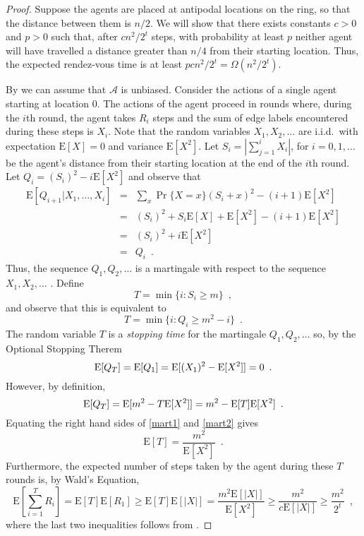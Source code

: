 \documentclass[lotsofwhite]{patmorin}
\newcommand{\E}{\mathrm{E}}
\newcommand{\A}{\mathcal{A}}
\begin{document}
\begin{proof}
Suppose the agents are placed at antipodal locations on the ring,
so that the distance between them is $n/2$.  We will show that there
exists constants $c >0$ and $p> 0$ such that, after $cn^2/2^t$ steps,
with probability at least $p$ neither agent will have travelled a
distance greater than $n/4$ from their starting location.  Thus, the
expected rendez-vous time is at least $p cn^2/2^t = \Omega(n^2/2^t)$.

By  we can assume that $\A$ is unbiased.
Consider the actions of a single agent starting at location 0.  The
actions of the agent proceed in rounds where, during the $i$th round,
the agent takes $R_i$ steps and the sum of edge labels encountered
during these steps is $X_i$.  Note that the random variables
$X_1,X_2,\ldots$ are i.i.d.\ with expectation $\E[X]=0$ and variance
$\E[X^2]$.  Let $S_i=\left|\sum_{j=1}^i X_i\right|$, for
$i=0,1,\ldots$ be the agent's
distance from their starting location at the end of the $i$th round.
Let $Q_i= (S_i)^2 - i\E[X^2]$ and observe that 
\begin{eqnarray*}
 \E\left[Q_{i+1}|X_1,\ldots,X_i\right]
 & = & \sum_{x} \Pr\{X=x\}\left(S_i + x\right)^2 - (i+1)\E[X^2] \\
 & = & (S_i)^2 + S_i\E[X] + \E[X^2] - (i+1)\E[X^2] \\
 & = & (S_i)^2 + i\E[X^2] \\
 & = & Q_i  \enspace .
\end{eqnarray*}
Thus, the sequence $Q_1,Q_2,\ldots$ is a martingale with respect to
the sequence $X_1,X_2,\ldots$ \cite{ross}.  Define
\[
    T = \min\{i : S_i \ge m \} \enspace ,
\]
and observe that this is equivalent to 
\[
    T = \min\{i : Q_i \ge m^2 - i \} \enspace .
\]
The random variable $T$ is a \emph{stopping time} for the martingale
$Q_1,Q_2,\ldots$ so, by the Optional Stopping Therem \cite{ross}
\begin{equation}
  \E[Q_T] 
    = \E[Q_1] 
    = \E[(X_1)^2 - \E[X^2]]
    = 0 \enspace . \eqlabel{mart1}
\end{equation}
However, by definition, 
\begin{equation}
  \E[Q_T] 
    = \E[m^2 - T\E[X^2]] 
    = m^2 - \E[T]\E[X^2] \enspace . \eqlabel{mart2}
\end{equation}
Equating the right hand sides of \eqref{mart1} and \eqref{mart2} gives 
\[
   \E[T] = \frac{m^2}{\E[X^2]} \enspace .
\]
Furthermore, the expected number of steps taken by the agent during
these $T$ rounds is, by Wald's Equation, 
\[
  \E\left[\sum_{i=1}^T R_i\right] 
    =  \E[T]\E[R_1] 
   \ge \E[T]\E[|X|] 
    =  \frac{m^2 \E[|X|]}{\E[X^2]} 
   \ge \frac{m^2}{c\E[|X|]} 
   \ge \frac{m^2}{2^t} 
   \enspace ,
\] 
where the last two inequalities follows from .








\end{proof}
\end{document}
